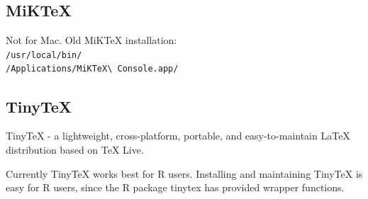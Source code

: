 \documentclass[letterpaper,dvipsnames]{article}
\begin{document}
\subsection{MiKTeX}

Not for Mac. Old MiKTeX installation:\\
\verb+/usr/local/bin/+\\
\verb+/Applications/MiKTeX\ Console.app/+

\subsection{TinyTeX}

TinyTeX - a lightweight, cross-platform, portable, and 
easy-to-maintain \LaTeX{} distribution based on TeX Live. 

Currently TinyTeX works best for R users. Installing and 
maintaining TinyTeX is easy for R users, since the R package 
tinytex has provided wrapper functions.
\end{document}
